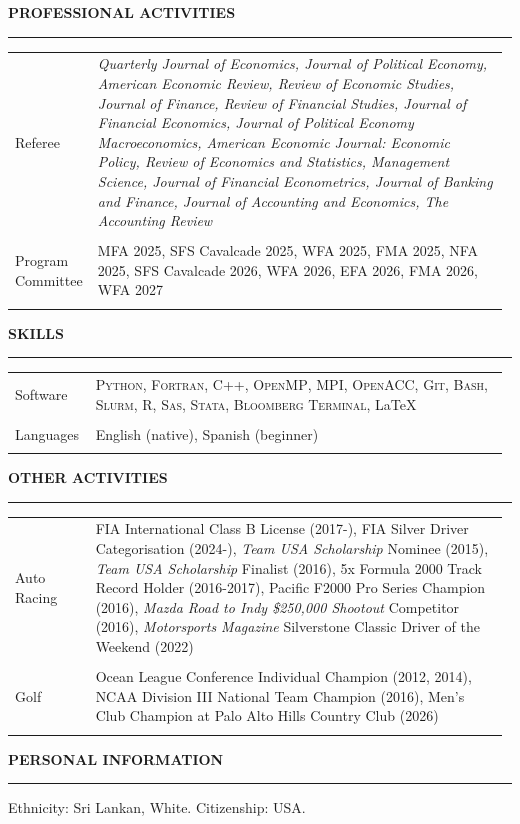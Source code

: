 \documentclass[a4paper, 10pt]{article}
\makeatletter
\newcommand{\cvsec}[1]
{
	\needspace{4\baselineskip}
	\noindent \textbf{#1}
	
	\vspace{2pt}
	
	\hrule
	
	\bigskip
}
\newcommand{\cvitem}[2]{#1 & #2 \\ & \\}
\newenvironment{cvfree}[1]
{
	\cvsec{#1}
	}
	{
	\bigskip
}
\newenvironment{cvchrono}[1]
{
	\cvsec{#1}
	\begin{longtable}{@{}>{\raggedright\arraybackslash}p{0.16\linewidth}@{\hspace{0.02\linewidth}}>{\raggedright\arraybackslash}p{0.82\linewidth}@{}}
}
{
	\end{longtable}
}
\makeatother
\begin{document}

\begin{cvchrono}{PROFESSIONAL ACTIVITIES}
	\cvitem{Referee}{\emph{Quarterly Journal of Economics, Journal of Political Economy, American Economic Review, Review of Economic Studies, Journal of Finance, Review of Financial Studies, Journal of Financial Economics, Journal of Political Economy Macroeconomics, American Economic Journal: Economic Policy, Review of Economics and Statistics, Management Science, Journal of Financial Econometrics, Journal of Banking and Finance, Journal of Accounting and Economics, The Accounting Review}}
	\cvitem{Program Committee}{MFA 2025, SFS Cavalcade 2025, WFA 2025, FMA 2025, NFA 2025, SFS Cavalcade 2026, WFA 2026, EFA 2026, FMA 2026, WFA 2027}
\end{cvchrono}

\begin{cvchrono}{SKILLS}
	\cvitem{Software}{\textsc{Python}, \textsc{Fortran}, \textsc{C++}, \textsc{OpenMP}, \textsc{MPI}, \textsc{OpenACC}, \textsc{Git}, \textsc{Bash}, \textsc{Slurm}, \textsc{R}, \textsc{Sas}, \textsc{Stata}, \textsc{Bloomberg Terminal}, \LaTeX}
	\cvitem{Languages}{English (native), Spanish (beginner)}
\end{cvchrono}

\begin{cvchrono}{OTHER ACTIVITIES}
	\cvitem{Auto Racing}{FIA International Class B License (2017-), FIA Silver Driver Categorisation (2024-), \emph{Team USA Scholarship} Nominee (2015), \emph{Team USA Scholarship} Finalist (2016), 5x Formula 2000 Track Record Holder (2016-2017), Pacific F2000 Pro Series Champion (2016), \emph{Mazda Road to Indy \$250,000 Shootout} Competitor (2016), \emph{Motorsports Magazine} Silverstone Classic Driver of the Weekend (2022)}
	\cvitem{Golf}{Ocean League Conference Individual Champion (2012, 2014), NCAA Division III National Team Champion (2016), Men's Club Champion at Palo Alto Hills Country Club (2026)}
\end{cvchrono}

\begin{cvfree}{PERSONAL INFORMATION}
Ethnicity: Sri Lankan, White. Citizenship: USA.
\end{cvfree}
\end{document}
